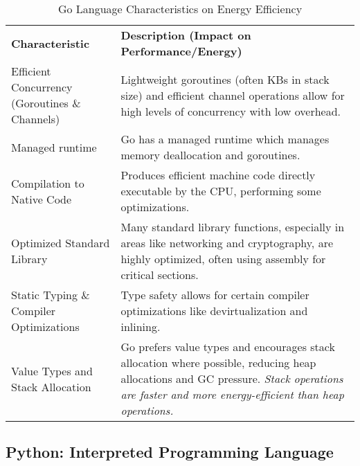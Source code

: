 \begin{table}[h]
	\centering
	\caption{Go Language Characteristics on Energy Efficiency}
	\label{tab:go_energy_characteristics}
	\begin{tabular}{>{\raggedright\arraybackslash}p{} >{\raggedright\arraybackslash}p{}}
		\toprule
		\multicolumn{2}{c}{\textbf{Characteristics Impacting Performance \& Energy Efficiency}} \\
		\midrule
		\textbf{Characteristic}                            & \textbf{Description (Impact on Performance/Energy)}\\
		\midrule
		Efficient Concurrency (Goroutines \& Channels)     & Lightweight goroutines (often KBs in stack size) and efficient channel operations allow for high levels of concurrency with low overhead. \\
		\addlinespace
		Managed runtime                                    & Go has a managed runtime which manages memory deallocation and \gls{goroutines}. \\
		\addlinespace
		Compilation to Native Code                         & Produces efficient machine code directly executable by the CPU, performing some optimizations. \\
		\addlinespace
		Optimized Standard Library                         & Many standard library functions, especially in areas like networking and cryptography, are highly optimized, often using assembly for critical sections. \\
		\addlinespace
		Static Typing \& Compiler Optimizations             & Type safety allows for certain compiler optimizations like devirtualization and inlining. \\
		\addlinespace
		Value Types and Stack Allocation                   & Go prefers value types and encourages stack allocation where possible, reducing heap allocations and GC pressure. \textit{Stack operations are faster and more energy-efficient than heap operations.} \\
		\bottomrule
	\end{tabular}
\end{table}


\subsection{Python: Interpreted Programming Language}

